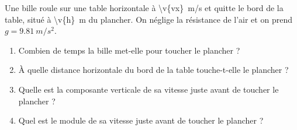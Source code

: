 Une bille roule sur une table horizontale à \qty{\v{vx}}{m/s} et quitte le bord de la table, situé à \qty{\v{h}}{m} du plancher. On néglige la résistance de l'air et on prend $g = \qty{9.81}{m/s^2}$.

\begin{enumerate}[label=\alph*)]
    \item Combien de temps la bille met-elle pour toucher le plancher ?
    \item À quelle distance horizontale du bord de la table touche-t-elle le plancher ?
    \item Quelle est la composante verticale de sa vitesse juste avant de toucher le plancher ?
    \item Quel est le module de sa vitesse juste avant de toucher le plancher ?
\end{enumerate}
